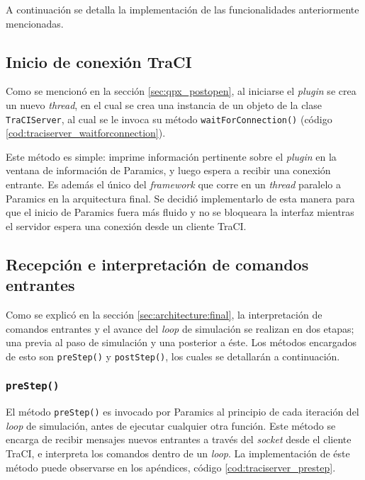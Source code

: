A continuación se detalla la implementación de las funcionalidades anteriormente mencionadas.

\subsection{Inicio de conexión TraCI}

Como se mencionó en la sección \ref{sec:qpx_postopen}, al iniciarse el \emph{plugin} se crea un nuevo \emph{thread}, en el cual se crea una instancia de un objeto de la clase \texttt{TraCIServer}, al cual se le invoca su método \texttt{waitForConnection()} (código \ref{cod:traciserver_waitforconnection}).



Este método es simple: imprime información pertinente sobre el \emph{plugin} en la ventana de información de Paramics, y luego espera a recibir una conexión entrante. Es además el único del \emph{framework} que corre en un \emph{thread} paralelo a Paramics en la arquitectura final. Se decidió implementarlo de esta manera para que el inicio de Paramics fuera más fluido y no se bloqueara la interfaz mientras el servidor espera una conexión desde un cliente TraCI.

\subsection{Recepción e interpretación de comandos entrantes}

Como se explicó en la sección \ref{sec:architecture:final}, la interpretación de comandos entrantes y el avance del \emph{loop} de simulación se realizan en dos etapas; una previa al paso de simulación y una posterior a éste. Los métodos encargados de esto son \texttt{preStep()} y \texttt{postStep()}, los cuales se detallarán a continuación.

\subsubsection{\texttt{preStep()}}

El método \texttt{preStep()} es invocado por Paramics al principio de cada iteración del \emph{loop} de simulación, antes de ejecutar cualquier otra función. Este método se encarga de recibir mensajes nuevos entrantes a través del \emph{socket} desde el cliente TraCI, e interpreta los comandos dentro de un \emph{loop}. La implementación de éste método puede observarse en los apéndices, código \ref{cod:traciserver_prestep}.

